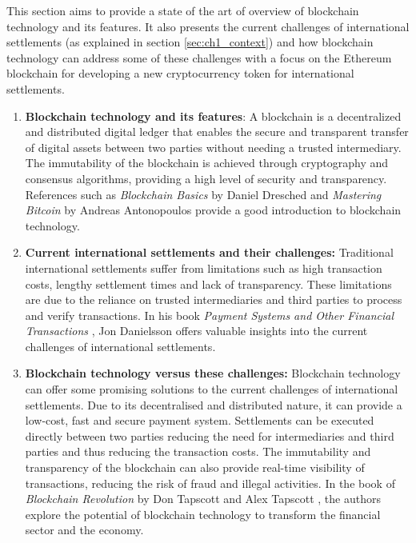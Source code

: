 This section aims to provide a state of the art of overview of blockchain technology and its features. It also presents the current challenges
of international settlements (as explained in section \ref{sec:ch1_context}) and how blockchain technology can address some of these challenges with a focus on the Ethereum blockchain for
developing a new cryptocurrency token for international settlements.

\begin{enumerate}
    \item \textbf{Blockchain technology and its features}:
          A blockchain is a decentralized and distributed digital ledger that enables the secure and transparent transfer of digital assets
          between two parties without needing a trusted intermediary. The immutability of the blockchain is achieved through
          cryptography and consensus algorithms, providing a high level of security and transparency. References such as \textit{Blockchain Basics} by
          Daniel Dresched \cite{Drescher2017-hj} and \textit{Mastering Bitcoin} by Andreas Antonopoulos \cite{Antonopoulos2017-et} provide a good introduction
          to blockchain technology.
    \item \textbf{Current international settlements and their challenges:}
          Traditional international settlements suffer from limitations such as high transaction costs, lengthy settlement times
          and lack of transparency. These limitations are due to the reliance on trusted intermediaries and third parties to process
          and verify transactions. In his book \textit{Payment Systems and Other Financial Transactions} \cite{Danielsson2013-cw}, Jon Danielsson offers
          valuable insights into the current challenges of international settlements.

    \item \textbf{Blockchain technology versus these challenges:}
          Blockchain technology can offer some promising solutions to the current challenges of international settlements. Due to its decentralised and distributed nature, it can provide
          a low-cost, fast and secure payment system. Settlements can be executed directly
          between two parties reducing the need for intermediaries and third parties and thus reducing the transaction costs. The immutability and
          transparency of the blockchain can also provide real-time visibility of transactions, reducing the risk of fraud and illegal activities.
          In the book of \textit{Blockchain Revolution} by Don Tapscott and Alex Tapscott \cite{Tapscott2018-ed}, the authors explore the potential of blockchain
          technology to transform the financial sector and the economy.


\end{enumerate}
